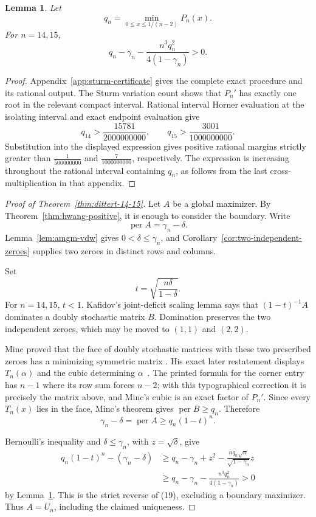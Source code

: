 \documentclass[11pt]{amsart}
\newtheorem{lemma}[theorem]{Lemma}
\theoremstyle{definition}
\theoremstyle{remark}
\begin{document}
\begin{lemma}\label{lem:dittert-certificate}
Let
\[
 q_n=\min_{0\leq x\leq1/(n-2)}P_n(x).
\]
For \(n=14,15\),
\[
 q_n-\gamma_n-\frac{n^3q_n^2}{4(1-\gamma_n)}>0.
\]
\end{lemma}

\begin{proof}
Appendix~\ref{app:sturm-certificate} gives the complete exact procedure and
its rational output.  The Sturm variation count shows that \(P_n'\) has
exactly one root in the relevant compact interval.  Rational interval Horner
evaluation at the isolating interval and exact endpoint evaluation give
\[
 q_{14}>\frac{15781}{2000000000},\qquad
 q_{15}>\frac{3001}{1000000000}.
\]
Substitution into the displayed expression gives positive rational margins
strictly greater than \(\frac1{500000000}\) and
\(\frac7{1000000000}\), respectively. The expression is increasing
throughout the rational interval containing \(q_n\), as follows from the
last cross-multiplication in that appendix.
\end{proof}

\begin{proof}[Proof of Theorem~\ref{thm:dittert-14-15}]
Let \(A\) be a global maximizer.  By
Theorem~\ref{thm:hwang-positive}, it is enough to consider the boundary.
Write
\[
 \operatorname{per}A=\gamma_n-\delta.
\]
Lemma~\ref{lem:amgm-vdw} gives \(0<\delta\leq\gamma_n\), and
Corollary~\ref{cor:two-independent-zeroes} supplies two zeroes in distinct
rows and columns.

Set
\[
 t=\sqrt{\frac{n\delta}{1-\delta}}.
\]
For \(n=14,15\), \(t<1\). Kafidov's joint-deficit scaling lemma
\cite[Lemma 3.1]{Kafidov} says that \((1-t)^{-1}A\) dominates a doubly
stochastic matrix \(B\). Domination preserves the two independent zeroes,
which may be moved to \((1,1)\) and \((2,2)\).

Minc proved that the face of doubly stochastic matrices with these two
prescribed zeroes has a minimizing symmetric matrix
\cite{Minc84}. His exact later restatement displays \(T_n(\alpha)\) and the
cubic determining \(\alpha\)~\cite[p.~153]{Minc94}. The printed formula for
the corner entry has \(n-1\) where its row sum forces \(n-2\); with this
typographical correction it is precisely the matrix above, and Minc's cubic
is an exact factor of \(P_n'\). Since every \(T_n(x)\) lies in the face,
Minc's theorem gives \(\operatorname{per}B\geq q_n\). Therefore
\[
 \gamma_n-\delta=\operatorname{per}A
 \geq q_n(1-t)^n.                                  \tag{19}
\]

Bernoulli's inequality and \(\delta\leq\gamma_n\), with
\(z=\sqrt{\delta}\), give
\[
\begin{split}
q_n(1-t)^n-(\gamma_n-\delta)
&\geq q_n-\gamma_n+z^2
 -\frac{nq_n\sqrt n}{\sqrt{1-\gamma_n}}z\\
&\geq q_n-\gamma_n-\frac{n^3q_n^2}{4(1-\gamma_n)}>0
\end{split}
\]
by Lemma~\ref{lem:dittert-certificate}. This is the strict reverse of
(19), excluding a boundary maximizer. Thus \(A=U_n\), including the claimed
uniqueness.
\end{proof}
\end{document}
